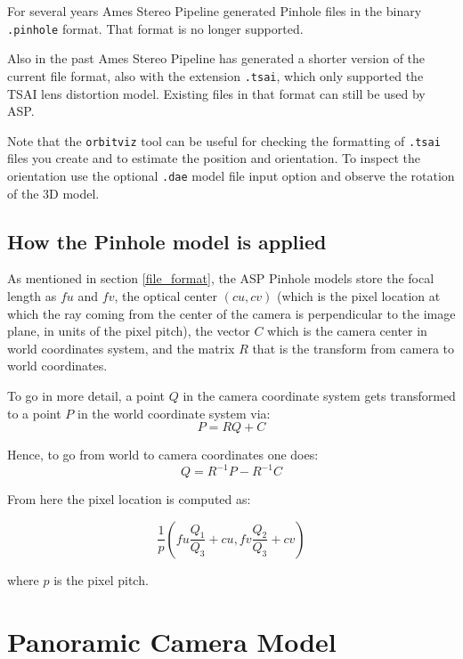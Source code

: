 For several years Ames Stereo Pipeline generated Pinhole files in the binary \texttt{.pinhole} format.
That format is no longer supported.

Also in the past Ames Stereo Pipeline has generated a shorter version of the current file
format, also with the extension \texttt{.tsai}, which only supported the TSAI lens distortion model.
Existing files in that format can still be used by ASP.

Note that the \texttt{orbitviz} tool can be useful for checking the formatting of \texttt{.tsai}
files you create and to estimate the position and orientation. To inspect the orientation use 
the optional \texttt{.dae} model file input option and observe the rotation of the 3D model.

\subsection{How the Pinhole model is applied}
\label{pinholemath}

As mentioned in section \ref{file_format}, the ASP Pinhole models store
the focal length as $fu$ and $fv$, the optical center $(cu, cv)$ (which
is the pixel location at which the ray coming from the center of the
camera is perpendicular to the image plane, in units of the pixel
pitch), the vector $C$ which is the camera center in world coordinates
system, and the matrix $R$ that is the transform from camera to world
coordinates.

To go in more detail, a point $Q$ in the camera coordinate system gets transformed
to a point $P$ in the world coordinate system via:
\begin{equation*}
 P = RQ + C
\end{equation*}

Hence, to go from world to camera coordinates one does:
\begin{equation*}
 Q = R^{-1}  P - R^{-1}  C
\end{equation*}

From here the pixel location is computed as:

\begin{equation*}
 \frac{1}{p} \left(fu \frac{Q_1}{Q_3} + cu, fv \frac{Q_2}{Q_3} + cv\right)
\end{equation*}

where $p$ is the pixel pitch.

\section{Panoramic Camera Model}
\label{panoramic}

